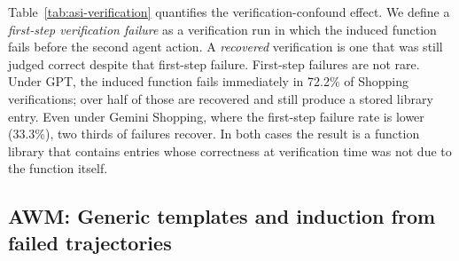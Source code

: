 Table~\ref{tab:asi-verification} quantifies the verification-confound effect.
We define a \emph{first-step verification failure} as a verification run in which the induced function fails before the second agent action.
A \emph{recovered} verification is one that was still judged correct despite that first-step failure.
First-step failures are not rare.
Under GPT, the induced function fails immediately in 72.2\% of Shopping verifications; over half of those are recovered and still produce a stored library entry.
Even under Gemini Shopping, where the first-step failure rate is lower (33.3\%), two thirds of failures recover.
In both cases the result is a function library that contains entries whose correctness at verification time was not due to the function itself.
\\

\begin{table}[ht]
\centering
{}
\caption{\textbf{ASI verification failures at the first high-level function call} on WebArena. Values are averages over three runs. \emph{Attempts}: total number of function induction attempts by ASI across all tasks. \emph{First-step fail}: number of attempts where the induced function failed before the second agent action. \emph{Recov.~rate}: fraction of first-step failures where the verification episode was nonetheless judged correct, causing a potentially broken function to be stored in the shared library.}
\label{tab:asi-verification}
\end{table}

\subsection{AWM: Generic templates and induction from failed trajectories}
\label{app:awm-failures}

